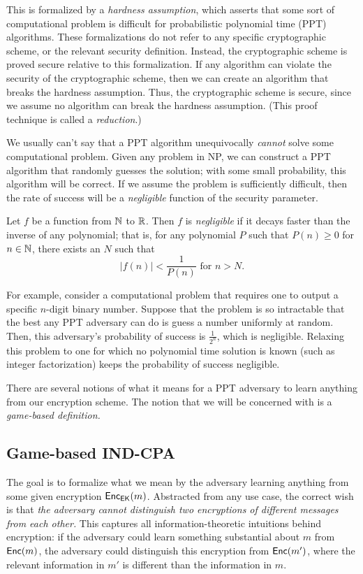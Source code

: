 	This is formalized by a \emph{hardness assumption}, which asserts that some sort of computational problem is difficult for probabilistic polynomial time (PPT) algorithms. These formalizations do not refer to any specific cryptographic scheme, or the relevant security definition. Instead, the cryptographic scheme is proved secure relative to this formalization. If any algorithm can violate the security of the cryptographic scheme, then we can create an algorithm that breaks the hardness assumption. Thus, the cryptographic scheme is secure, since we assume no algorithm can break the hardness assumption. (This proof technique is called a \emph{reduction}.)

	We usually can't say that a PPT algorithm unequivocally \emph{cannot} solve some computational problem. Given any problem in NP, we can construct a PPT algorithm that randomly guesses the solution; with some small probability, this algorithm will be correct. If we assume the problem is sufficiently difficult, then the rate of success will be a \emph{negligible} function of the security parameter.

	\begin{definition} Let $f$ be a function from $\mathbb{N}$ to $\mathbb{R}$. Then $f$ is \emph{negligible} if it decays faster than the inverse of any polynomial; that is, for any polynomial $P$ such that $P(n) \geq 0$ for $n \in \mathbb{N}$, there exists an $N$ such that
	\[|f(n)| < \frac{1}{P(n)} \text{ for $n > N$.}\]
	\end{definition}

	For example, consider a computational problem that requires one to output a specific $n$-digit binary number. Suppose that the problem is so intractable that the best any PPT adversary can do is guess a number uniformly at random. Then, this adversary's probability of success is $\frac{1}{2^n}$, which is negligible. Relaxing this problem to one for which no polynomial time solution is known (such as integer factorization) keeps the probability of success negligible.

	There are several notions of what it means for a PPT adversary to learn anything from our encryption scheme. The notion that we will be concerned with is a \textit{game-based definition.}

\subsection{Game-based IND-CPA}

	The goal is to formalize what we mean by the adversary learning anything from some given encryption ${\sf Enc}_{\sf EK}(m)$. Abstracted from any use case, the correct wish is that \textit{the adversary cannot distinguish two encryptions of different messages from each other.} This captures all information-theoretic intuitions behind encryption: if the adversary could learn something substantial about $m$ from ${\sf Enc}(m)$, the adversary could distinguish this encryption from  ${\sf Enc}(m')$, where the relevant information in $m'$ is different than the information in $m$.

